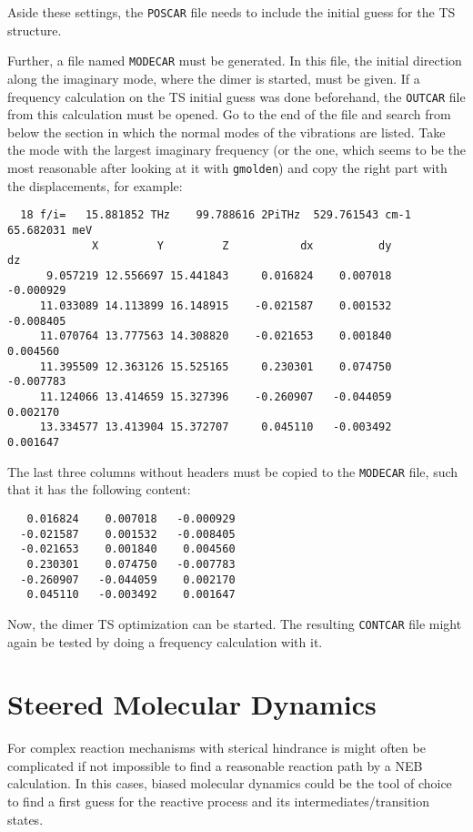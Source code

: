 \documentclass[a4paper,11pt]{article}
\begin{document}
Aside these settings, the \texttt{POSCAR} file needs to include the initial guess for the TS structure.
 
Further, a file named \texttt{MODECAR} must be generated. In this file, the initial direction along the 
imaginary mode, where the dimer is started, must be given. If a frequency calculation on the TS initial
guess was done beforehand, the \texttt{OUTCAR} file from this calculation must be opened.
Go to the end of the file and search from below the section in which the normal modes of the 
vibrations are listed. Take the mode with the largest imaginary frequency (or the one, which seems 
to be the most reasonable after looking at it with \texttt{gmolden}) and copy the right part with the 
displacements, for example:

\begin{verbatim}
  18 f/i=   15.881852 THz    99.788616 2PiTHz  529.761543 cm-1    65.682031 meV
             X         Y         Z           dx          dy          dz
      9.057219 12.556697 15.441843     0.016824    0.007018   -0.000929
     11.033089 14.113899 16.148915    -0.021587    0.001532   -0.008405
     11.070764 13.777563 14.308820    -0.021653    0.001840    0.004560
     11.395509 12.363126 15.525165     0.230301    0.074750   -0.007783
     11.124066 13.414659 15.327396    -0.260907   -0.044059    0.002170
     13.334577 13.413904 15.372707     0.045110   -0.003492    0.001647
\end{verbatim}
The last three columns without headers must be copied to the \texttt{MODECAR} file, such that it has 
the following content:

\begin{verbatim}
   0.016824    0.007018   -0.000929
  -0.021587    0.001532   -0.008405
  -0.021653    0.001840    0.004560
   0.230301    0.074750   -0.007783
  -0.260907   -0.044059    0.002170
   0.045110   -0.003492    0.001647
\end{verbatim}

Now, the dimer TS optimization can be started. 
The resulting \texttt{CONTCAR} file might again be tested by doing a frequency calculation with it.


\section{Steered Molecular Dynamics}

For complex reaction mechanisms with sterical hindrance is might often be complicated if not
impossible to find a reasonable reaction path by a NEB calculation.
In this cases, biased molecular dynamics could be the tool of choice to find a first guess
for the reactive process and its intermediates/transition states.
\end{document}
